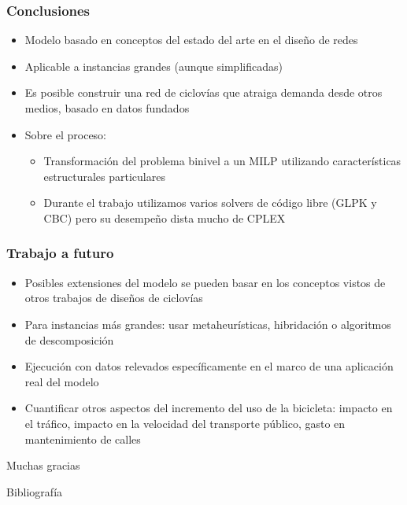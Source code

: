 \documentclass[aspectratio=43, 10pt]{beamer}
\begin{document}
\begin{frame}
    \frametitle{Conclusiones}

    \begin{itemize}
        \item{Modelo basado en conceptos del estado del arte en el diseño de redes}
        \item{Aplicable a instancias grandes (aunque simplificadas)}
        \item{Es posible construir una red de ciclovías que atraiga demanda desde otros medios, basado en datos fundados}
        \item{Sobre el proceso:
            \begin{itemize}
                \item{Transformación del problema binivel a un MILP utilizando características estructurales particulares}
                \item{Durante el trabajo utilizamos varios solvers de código libre (GLPK y CBC) pero su desempeño dista mucho de CPLEX}
            \end{itemize}
        }
    \end{itemize}

\end{frame}

\begin{frame}
    \frametitle{Trabajo a futuro}

    \begin{itemize}
        \item{Posibles extensiones del modelo se pueden basar en los conceptos vistos de otros trabajos de diseños de ciclovías}
        \item{Para instancias más grandes: usar metaheurísticas, hibridación o algoritmos de descomposición}
        \item{Ejecución con datos relevados específicamente en el marco de una aplicación real del modelo}
        \item{Cuantificar otros aspectos del incremento del uso de la bicicleta:
            impacto en el tráfico,
            impacto en la velocidad del transporte público,
            gasto en mantenimiento de calles
        }
    \end{itemize}
\end{frame}

\begin{frame}[standout]
    Muchas gracias
\end{frame}

\begin{frame}{Bibliografía}
    \printbibliography[heading=none]
\end{frame}
\end{document}

